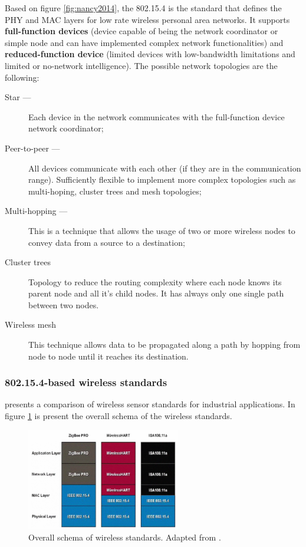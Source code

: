 Based on figure \ref{fig:nancy2014}, the 802.15.4 is the standard that defines the PHY and MAC layers for low rate wireless personal area networks. It supports \textbf{full-function devices} (device capable of being the network coordinator or simple node and can have implemented complex network functionalities) and \textbf{reduced-function device} (limited devices with low-bandwidth limitations and limited or no-network intelligence). The possible network topologies are the following:

\begin{description}
	\item[Star ---] Each device in the network communicates with the full-function device network coordinator;
	
	\item[Peer-to-peer ---] All devices communicate with each other (if they are in the communication range). Sufficiently flexible to implement more complex topologies such as multi-hoping, cluster trees and mesh topologies;
	
	\item[Multi-hopping ---] This is a technique that allows the usage of two or more wireless nodes to convey data from a source to a destination;
	
	\item[Cluster trees] Topology to reduce the routing complexity where each node knows its parent node and all it's child nodes. It has always only one single path between two nodes.
	
	\item[Wireless mesh] This technique allows data to be propagated along a path by hopping from node to node until it reaches its destination.
	
\end{description}

\subsubsection{802.15.4-based wireless standards}

\cite{Radmand2010} presents a comparison of wireless sensor standards for industrial applications. In figure \ref{fig:radmand2010} is present the overall schema of the wireless standards.


\begin{figure}[h!]
	\centering
	\includegraphics[width=0.6\textwidth,keepaspectratio]{figures/radmand2010}
	\caption{Overall schema of wireless standards. Adapted from \cite{Radmand2010}.}
	\label{fig:radmand2010}
\end{figure}


